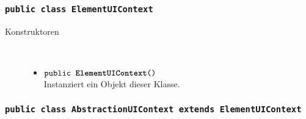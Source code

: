 \subsubsection{\normalfont \texttt{public class \textbf{ElementUIContext}}}

\begin{description}
\item[Konstruktoren] \hfill \\
	\vspace{-.8cm}
	\begin{itemize}
		\item $\texttt{public \textbf{ElementUIContext}()}$ \\ Instanziert ein Objekt dieser Klasse.

	
	\end{itemize}
\end{description}
	
	
	
	\subsubsection{\normalfont \texttt{public class \textbf{AbstractionUIContext} extends ElementUIContext}}

